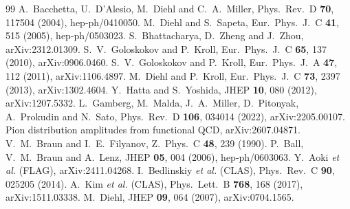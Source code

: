 \documentclass[aps,prd,showpacs,notitlepage,nofootinbib,preprintnumbers,amsmath,amssymb]{revtex4-2}
\begin{document}
\clearpage


\begin{thebibliography}{99}
 A.~Bacchetta, U.~D'Alesio, M.~Diehl and C.~A.~Miller, Phys.\ Rev.\ D \textbf{70}, 117504 (2004), hep-ph/0410050.
 M.~Diehl and S.~Sapeta, Eur.\ Phys.\ J.\ C \textbf{41}, 515 (2005), hep-ph/0503023.
 S.~Bhattacharya, D.~Zheng and J.~Zhou, arXiv:2312.01309.
 S.~V.~Goloskokov and P.~Kroll, Eur.\ Phys.\ J.\ C \textbf{65}, 137 (2010), arXiv:0906.0460.
 S.~V.~Goloskokov and P.~Kroll, Eur.\ Phys.\ J.\ A \textbf{47}, 112 (2011), arXiv:1106.4897.
 M.~Diehl and P.~Kroll, Eur.\ Phys.\ J.\ C \textbf{73}, 2397 (2013), arXiv:1302.4604.
 Y.~Hatta and S.~Yoshida, JHEP \textbf{10}, 080 (2012), arXiv:1207.5332.
 L.~Gamberg, M.~Malda, J.~A.~Miller, D.~Pitonyak, A.~Prokudin and N.~Sato, Phys.\ Rev.\ D \textbf{106}, 034014 (2022), arXiv:2205.00107.
 Pion distribution amplitudes from functional QCD, arXiv:2607.04871.
 V.~M.~Braun and I.~E.~Filyanov, Z.\ Phys.\ C \textbf{48}, 239 (1990).
 P.~Ball, V.~M.~Braun and A.~Lenz, JHEP \textbf{05}, 004 (2006), hep-ph/0603063.
 Y.~Aoki \emph{et al.} (FLAG), arXiv:2411.04268.
 I.~Bedlinskiy \emph{et al.} (CLAS), Phys.\ Rev.\ C \textbf{90}, 025205 (2014).
 A.~Kim \emph{et al.} (CLAS), Phys.\ Lett.\ B \textbf{768}, 168 (2017), arXiv:1511.03338.
 M.~Diehl, JHEP \textbf{09}, 064 (2007), arXiv:0704.1565.
\end{thebibliography}
\end{document}
